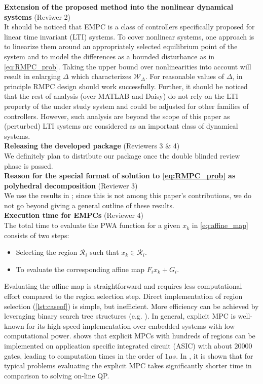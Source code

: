 {\textbf{Extension of the proposed method into the nonlinear dynamical systems} (Reviwer 2)\\
It should be noticed that EMPC is a class of controllers specifically proposed for linear time invariant (LTI) systems. To cover nonlinear systems, one approach is to linearize them around an appropriately selected equilibrium point of the system and to model the differences as a bounded disturbance as in \autoref{eq:RMPC_prob}. Taking the upper bound over nonlinearities into account will result in enlarging $\Delta$ which characterizes $\mathcal{W}_{\Delta}$. For reasonable values of $\Delta$, in principle RMPC design should work successfully. Further, it should be noticed that the rest of analysis (over MATLAB and Daisy) do not rely on the LTI property of the under study system and could be adjusted for other families of controllers. However, such analysis are beyond the scope of this paper as (perturbed) LTI systems are considered as an important class of dynamical systems.\\ 
\textbf{Releasing the developed package} (Reviewers 3 $\&$ 4)\\
We definitely plan to distribute our package once the double blinded review phase is passed.\\ 
\textbf{Reason for the special format of solution to \autoref{eq:RMPC_prob} as polyhedral decomposition} (Reviewer 3)\\
We use the results in \cite{delaPea:2005}; since this is not among this paper's contributions, we do not go beyond giving a general outline of these results.
\\
\textbf{Execution time for EMPCs} (Reviewer 4)\\
The total time to evaluate the PWA function for a given $x_k$ in \autoref{eq:affine_map} consists of two steps:
\begin{itemize}
\item Selecting the region $\mathcal R_i$ such that $x_k\in \mathcal R_i$.
\item To evaluate the corresponding affine map $F_i x_k +G_i$. 
\end{itemize}
Evaluating the affine map is straightforward and requires less computational effort compared to the region selection step. Direct implementation of region selection (\autoref{lst:caseof}) is simple, but inefficient. More efficiency can be achieved by leveraging binary search tree structures (e.g. \cite{Mnnigmann:2011}). In general, explicit MPC is well-known for its high-speed implementation over embedded systems with low computational power. \cite{Johansen:2007} shows that explicit MPCs with hundreds of regions can be implemented on application specific integrated circuit (ASIC) with about $20000$ gates, leading to computation times in the order of $1\mu s$. In \cite{Bemporad:2006}, it is shown that for typical problems evaluating the explicit MPC takes significantly shorter time in comparison to solving on-line QP. \\
}
